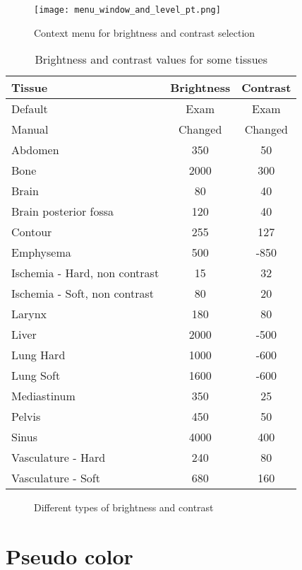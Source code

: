 \begin{figure}[!htb]
\centering
\texttt{[image: menu\_window\_and\_level\_pt.png]}
\caption{Context menu for brightness and contrast selection}
\label{fig:window_level}
\end{figure}

\begin{table}[h]
\centering
\caption{Brightness and contrast values for some tissues}
\begin{tabular}{lcc}\\
\hline %
Tissue & Brightness & Contrast\\
\hline
\hline
Default & Exam & Exam\\
Manual & Changed & Changed\\
Abdomen & 350 & 50\\
Bone & 2000 & 300\\
Brain & 80 & 40\\
Brain posterior fossa & 120 & 40\\
Contour & 255 & 127\\
Emphysema & 500 & -850\\
Ischemia - Hard, non contrast & 15 & 32\\
Ischemia - Soft, non contrast & 80 & 20\\
Larynx & 180 & 80\\
Liver & 2000 & -500\\
Lung Hard & 1000 & -600\\
Lung Soft & 1600 & -600\\
Mediastinum & 350 & 25\\
Pelvis & 450 & 50\\
Sinus & 4000 & 400\\
Vasculature - Hard & 240 & 80\\
Vasculature - Soft & 680 & 160\\
\hline
\end{tabular}
\label{tab:window_level}
\end{table} 

\begin{figure}
  \centering
  \caption{Different types of brightness and contrast}
  \label{fig:two_window_level}
\end{figure}


\section{Pseudo color}

